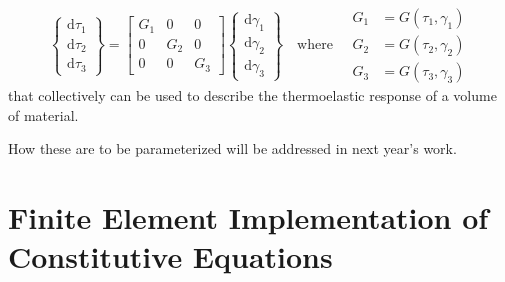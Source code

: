 \begin{displaymath}
    \left\{ \begin{matrix}
    \mathrm{d} \tau_1 \\ \mathrm{d} \tau_2 \\ \mathrm{d} \tau_3
    \end{matrix} \right\} = \begin{bmatrix}
    G_1 & 0 & 0 \\ 0 & G_2 & 0 \\ 0 & 0 & G_3
    \end{bmatrix} \left\{ \begin{matrix}
    \mathrm{d} \gamma_1 \\ \mathrm{d} \gamma_2 \\ \mathrm{d} \gamma_3
    \end{matrix} \right\}
    \quad \text{where} \quad
    \begin{aligned}
    G_1 & = G ( \tau_1 , \gamma_1 ) \\
    G_2 & = G ( \tau_2 , \gamma_2 ) \\
    G_3 & = G ( \tau_3 , \gamma_3 )
    \end{aligned}
\end{displaymath}
that collectively can be used to describe the thermo\-elastic response of a volume of material.  

How these are to be parameterized will be addressed in next year's work.

\section{Finite Element Implementation of Constitutive Equations}
\label{secFE_CE}

